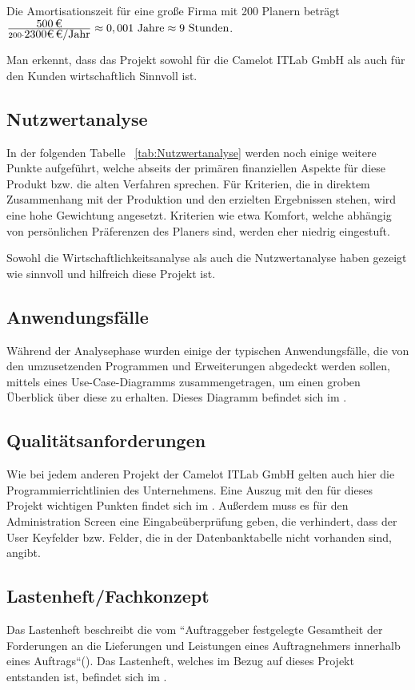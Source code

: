 Die Amortisationszeit für eine große Firma mit 200 Planern beträgt
$\frac{\eur{500}}{200 \cdot \eur{2300€} \mbox{/Jahr} } \approx 0,001 \mbox{ Jahre} \approx 9 \mbox{ Stunden}$.

Man erkennt, dass das Projekt sowohl für die Camelot ITLab GmbH als auch für den Kunden wirtschaftlich Sinnvoll ist.

\subsection{Nutzwertanalyse}
\label{sec:Nutzwertanalyse}
In der folgenden Tabelle ~\ref{tab:Nutzwertanalyse} werden noch einige weitere Punkte aufgeführt, welche abseits der primären finanziellen Aspekte für diese Produkt bzw. die alten Verfahren sprechen. Für Kriterien, die in direktem Zusammenhang mit der Produktion und den erzielten Ergebnissen stehen, wird eine hohe Gewichtung angesetzt. Kriterien wie etwa Komfort, welche abhängig von persönlichen Präferenzen des Planers sind, werden eher niedrig eingestuft.


Sowohl die Wirtschaftlichkeitsanalyse als auch die Nutzwertanalyse haben gezeigt wie sinnvoll und hilfreich diese Projekt ist.

\subsection{Anwendungsfälle}
\label{sec:Anwendungsfaelle}
Während der Analysephase wurden einige der typischen Anwendungsfälle, die von den umzusetzenden Programmen und Erweiterungen abgedeckt werden sollen, mittels eines Use-Case-Diagramms zusammengetragen, um einen groben Überblick über diese zu erhalten. Dieses Diagramm befindet sich im .

\subsection{Qualitätsanforderungen}
\label{sec:Qualitaetsanforderungen}
Wie bei jedem anderen Projekt der Camelot ITLab GmbH gelten auch hier die Programmierrichtlinien des Unternehmens. Eine Auszug mit den für dieses Projekt wichtigen Punkten findet sich im . Außerdem muss es für den Administration Screen eine Eingabeüberprüfung geben, die verhindert, dass der User Keyfelder bzw. Felder, die in der Datenbanktabelle nicht vorhanden sind, angibt.

\subsection{Lastenheft/Fachkonzept}
\label{sec:Lastenheft}
Das Lastenheft beschreibt die vom ``Auftraggeber festgelegte Gesamtheit der Forderungen an die Lieferungen und Leistungen eines Auftragnehmers innerhalb eines Auftrags``(\cite{Wiki.Induux}). Das Lastenheft, welches im Bezug auf dieses Projekt entstanden ist, befindet sich im . 

